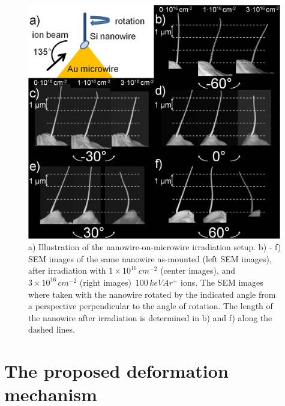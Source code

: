 \begin{figure}[thbp]
	\centering
		\includegraphics[width=0.99\textwidth]{images/reverseangle.jpg}
	\caption{ a) Illustration of the nanowire-on-microwire irradiation setup. b) - f) SEM images of the same nanowire as-mounted (left SEM images), after irradiation with $1\times10^{16}\,cm^{-2}$  (center images), and $3\times10^{16}\,cm^{-2}$ (right images) $\,100\,keV Ar^+$ ions. The SEM images where taken with the nanowire rotated by the indicated angle from a perspective perpendicular to the angle of rotation. The length of the nanowire after irradiation is determined in b) and f) along the dashed lines.}
	\label{reverseangle}
\end{figure}

\section{The proposed deformation mechanism}

